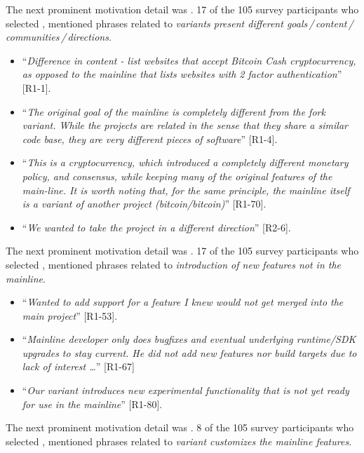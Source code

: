 \nd The next prominent  motivation detail was . 17 of the 105 survey participants who selected ,  mentioned phrases related to \emph{variants present different goals\,/\,content\,/\,communities\,/\,directions}.

\begin{itemize}[leftmargin=*]
\item ``\emph{Difference in content - list websites that accept Bitcoin Cash cryptocurrency, as opposed to the mainline that lists websites with 2 factor authentication}'' [R1-1].
\item ``\emph{The original goal of the mainline is completely different from the fork variant. While the projects are related in the sense that they share a similar code base, they are very different pieces of software}'' [R1-4].
\item ``\emph{This is a cryptocurrency, which introduced a completely different monetary policy, and consensus, while keeping many of the original features of the main-line. It is worth noting that, for the same principle, the mainline itself is a variant of another project (bitcoin/bitcoin)}'' [R1-70].
\item  ``\emph{We wanted to take the project in a different direction}'' [R2-6].
\end{itemize}

\nd The next prominent  motivation detail was .
17 of the 105 survey participants who selected , mentioned phrases related to \emph{introduction of new features not in the mainline}.

\begin{itemize}[leftmargin=*]
\item ``\emph{Wanted to add support for a feature I knew would not get merged into the main project}'' [R1-53].
\item ``\emph{Mainline developer only does bugfixes and eventual underlying runtime/SDK upgrades to stay current. He did not add new features nor build targets due to lack of interest \ldots}'' [R1-67]
\item ``\emph{Our variant introduces new experimental functionality that is not yet ready for use in the mainline}'' [R1-80].
\end{itemize}
  
\nd The next prominent  motivation detail was .
8 of the 105 survey participants who selected , mentioned phrases related to \emph{variant customizes the mainline features}.

